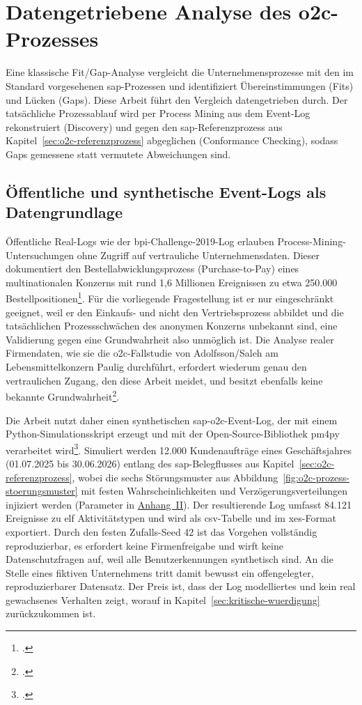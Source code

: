 \chapter{Datengetriebene Analyse des \gls{o2c}-Prozesses}\label{ch:umsetzung}

Eine klassische Fit/Gap-Analyse vergleicht die Unternehmensprozesse mit den im Standard vorgesehenen \gls{sap}-Prozessen und identifiziert Übereinstimmungen (Fits) und Lücken (Gaps). Diese Arbeit führt den Vergleich datengetrieben durch. Der tatsächliche Prozessablauf wird per Process Mining aus dem Event-Log rekonstruiert (Discovery) und gegen den \gls{sap}-Referenzprozess aus Kapitel~\ref{sec:o2c-referenzprozess} abgeglichen (Conformance Checking), sodass Gaps gemessene statt vermutete Abweichungen sind.

\section{Öffentliche und synthetische Event-Logs als Datengrundlage}\label{sec:datengrundlage}

Öffentliche Real-Logs wie der \gls{bpi}-Challenge-2019-Log erlauben Process-Mining-Untersuchungen ohne Zugriff auf vertrauliche Unternehmensdaten. Dieser dokumentiert den Bestellabwicklungsprozess (Purchase-to-Pay) eines multinationalen Konzerns mit rund 1,6 Millionen Ereignissen zu etwa 250.000 Bestellpositionen\footcite[Vgl.][]{vandongen2019bpi}. Für die vorliegende Fragestellung ist er nur eingeschränkt geeignet, weil er den Einkaufs- und nicht den Vertriebsprozess abbildet und die tatsächlichen Prozessschwächen des anonymen Konzerns unbekannt sind, eine Validierung gegen eine Grundwahrheit also unmöglich ist. Die Analyse realer Firmendaten, wie sie die \gls{o2c}-Fallstudie von Adolfsson/Saleh am Lebensmittelkonzern Paulig durchführt, erfordert wiederum genau den vertraulichen Zugang, den diese Arbeit meidet, und besitzt ebenfalls keine bekannte Grundwahrheit\footcite[Vgl.][S.~4 ff.\ und 28]{adolfsson2026o2c}.

Die Arbeit nutzt daher einen synthetischen \gls{sap}-\gls{o2c}-Event-Log, der mit einem Python-Simulationsskript erzeugt und mit der Open-Source-Bibliothek \gls{pm4py} verarbeitet wird\footcite[Vgl.][]{berti2019pm4py}. Simuliert werden 12.000 Kundenaufträge eines Geschäftsjahres (01.07.2025 bis 30.06.2026) entlang des \gls{sap}-Belegflusses aus Kapitel~\ref{sec:o2c-referenzprozess}, wobei die sechs Störungsmuster aus Abbildung~\ref{fig:o2c-prozess-stoerungsmuster} mit festen Wahrscheinlichkeiten und Verzögerungsverteilungen injiziert werden (Parameter in \hyperref[anh:parameter]{Anhang~II}). Der resultierende Log umfasst 84.121 Ereignisse zu elf Aktivitätstypen und wird als \gls{csv}-Tabelle und im \gls{xes}-Format exportiert. Durch den festen Zufalls-Seed 42 ist das Vorgehen vollständig reproduzierbar, es erfordert keine Firmenfreigabe und wirft keine Datenschutzfragen auf, weil alle Benutzerkennungen synthetisch sind. An die Stelle eines fiktiven Unternehmens tritt damit bewusst ein offengelegter, reproduzierbarer Datensatz. Der Preis ist, dass der Log modelliertes und kein real gewachsenes Verhalten zeigt, worauf in Kapitel~\ref{sec:kritische-wuerdigung} zurückzukommen ist.

